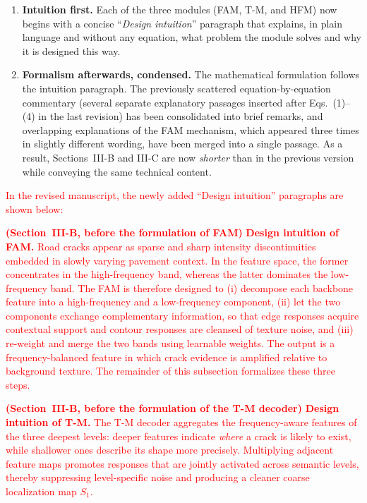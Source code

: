 \documentclass[letterpaper,journal,onecolumn,12pt]{IEEEtran}
\begin{document}
\begin{enumerate}
    \item \textbf{Intuition first.} Each of the three modules (FAM, T-M, and HFM) now begins with a concise
    ``\emph{Design intuition}'' paragraph that explains, in plain language and without any equation, what problem the
    module solves and why it is designed this way.

    \item \textbf{Formalism afterwards, condensed.} The mathematical formulation follows the intuition paragraph.
    The previously scattered equation-by-equation commentary (several separate explanatory passages inserted after
    Eqs.~(1)--(4) in the last revision) has been consolidated into brief remarks, and overlapping explanations of the
    FAM mechanism, which appeared three times in slightly different wording, have been merged into a single passage.
    As a result, Sections~III-B and III-C are now \emph{shorter} than in the previous version while conveying the
    same technical content.
\end{enumerate}

\textcolor{red}{In the revised manuscript, the newly added ``Design intuition'' paragraphs are shown below:}

\textcolor{red}{
\textbf{(Section~III-B, before the formulation of FAM)}
\textbf{Design intuition of FAM.} Road cracks appear as sparse and sharp intensity discontinuities embedded in slowly
varying pavement context. In the feature space, the former concentrates in the high-frequency band, whereas the
latter dominates the low-frequency band. The FAM is therefore designed to (i) decompose each backbone feature into a
high-frequency and a low-frequency component, (ii) let the two components exchange complementary information, so that
edge responses acquire contextual support and contour responses are cleansed of texture noise, and (iii) re-weight and merge the two bands using learnable weights. The output is a frequency-balanced feature in which crack
evidence is amplified relative to background texture. The remainder of this subsection formalizes these three
steps.
}

\textcolor{red}{
\textbf{(Section~III-B, before the formulation of the T-M decoder)}
\textbf{Design intuition of T-M.} The T-M decoder aggregates the frequency-aware features of the three deepest
levels: deeper features indicate \emph{where} a crack is likely to exist, while shallower ones describe its shape
more precisely. Multiplying adjacent feature maps promotes responses that are jointly activated across semantic levels, thereby suppressing level-specific noise and producing a cleaner coarse localization map $S_1$.
}
\end{document}
